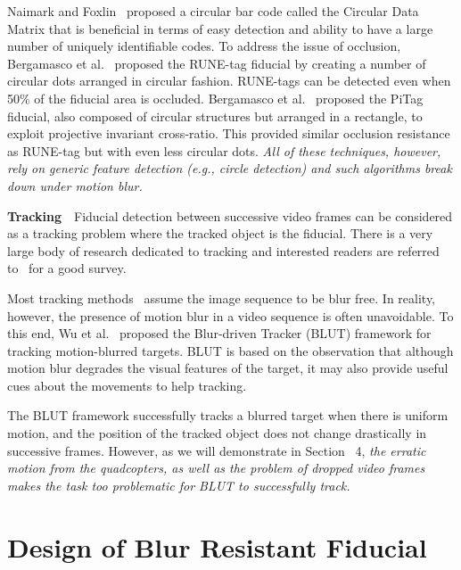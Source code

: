 \documentclass[10pt,twocolumn,letterpaper]{article}
\begin{document}
Naimark and Foxlin~\cite{NaimarkF02} proposed a circular bar code
called the Circular Data Matrix that is beneficial in terms of easy
detection and ability to have a large number of uniquely identifiable
codes.  To address the issue of occlusion, Bergamasco et
al.~\cite{runetag11} proposed the RUNE-tag fiducial by creating a
number of circular dots arranged in circular fashion. RUNE-tags can be
detected even when 50\% of the fiducial area is occluded. Bergamasco
et al.~\cite{Pitag13} proposed the PiTag fiducial, also composed of
circular structures but arranged in a rectangle, to exploit projective
invariant cross-ratio.  This provided similar occlusion resistance as
RUNE-tag but with even less circular dots. {\it All of these techniques,
however, rely on generic feature detection (e.g., circle detection)
and such algorithms break down under motion blur.}


{\textbf{Tracking}}~~Fiducial detection between successive video
frames can be considered as a tracking problem where the tracked
object is the fiducial.  There is a very large body of research
dedicated to tracking and interested readers are referred
to~\cite{Yilmaz:2006} for a good survey.

Most tracking methods~\cite{Ross:2008,Wu:2009,Perez02,Mei:2009} assume
the image sequence to be blur free. In reality, however, the presence
of motion blur in a video sequence is often unavoidable. To this end,
Wu et al.~\cite{Wu:2011} proposed the Blur-driven Tracker (BLUT)
framework for tracking motion-blurred targets. BLUT is based on the
observation that although motion blur degrades the visual features of
the target, it may also provide useful cues about the movements to
help tracking.

The BLUT framework successfully tracks a blurred target when there is
uniform motion, and the position of the tracked object does not change
drastically in successive frames. However, as we will demonstrate in
Section~ 4, {\it the erratic motion from the quadcopters, as well as the
problem of dropped video frames makes the task too problematic for
BLUT to successfully track.}

\section{Design of Blur Resistant Fiducial}
\end{document}
